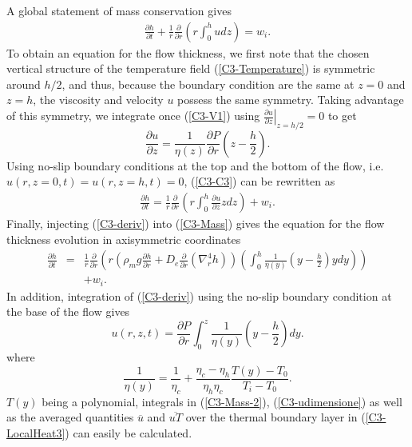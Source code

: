 A global statement of mass conservation gives
\begin{eqnarray}
  \frac{\partial h}{\partial t}+ \frac{1}{r}
  \frac{\partial}{\partial
  r} \left( r\int_0^hudz\right)= w_i.
  \label{C3-C3}
\end{eqnarray}
To obtain an  equation for the flow thickness, we  first note that the
chosen    vertical     structure    of    the     temperature    field
(\ref{C3-Temperature}) is  symmetric around  $h/2$, and  thus, because
the boundary condition are the same  at $z=0$ and $z=h$, the viscosity
and velocity $u$ possess the  same symmetry.  Taking advantage of this
symmetry,      we     integrate      once     (\ref{C3-V1})      using
$\left.\frac{\partial u}{\partial z}\right|_{z=h/2}=0$ to get
\begin{equation}
  \frac{\partial   u}{\partial   z}   =   \frac{1}{\eta(z)}\frac{\partial
    P}{\partial r}\left(z-\frac{h}{2}\right).
  \label{C3-deriv}
\end{equation}
Using no-slip  boundary conditions at  the top  and the bottom  of the
flow, i.e.  $u(r,z=0,t)=u(r,z=h,t)=0$,  (\ref{C3-C3}) can be rewritten
as
\begin{eqnarray}
  \frac{\partial h}{\partial t} = \frac{1}{r}
  \frac{\partial}{\partial
  r} \left( r\int_0^h\frac{\partial u}{\partial z}zdz\right) + w_i.
  \label{C3-Mass}
\end{eqnarray}
Finally,  injecting (\ref{C3-deriv})  into  (\ref{C3-Mass}) gives  the
equation for the flow thickness evolution in axisymmetric coordinates
\begin{eqnarray}
  \frac{\partial h}{\partial t} &=& \frac{1}{r}
  \frac{\partial}{\partial r} \left( r\left(\rho_m g \frac{\partial h}{\partial      r}+D_e\frac{\partial}{\partial      r}\left(\nabla_r^4h\right)\right)\left(\int_0^h\frac{1}{\eta(y)}\left(y-\frac{h}{2}\right)ydy\right)\right)\nonumber\\
  &&+ w_i.
  \label{C3-Mass-2}
\end{eqnarray}
In  addition,  integration  of   (\ref{C3-deriv})  using  the  no-slip
boundary condition at the base of the flow gives
\begin{equation}
  u(r,z,t)        =        \frac{\partial        P}{\partial        r}
  \int_0^z\frac{1}{\eta(y)}\left(y-\frac{h}{2}\right)dy.
  \label{C3-udimensione}
\end{equation}
where
\begin{equation}
  \frac{1}{\eta(y)} = \frac{1}{\eta_c}+\frac{\eta_c-\eta_h}{\eta_h\eta_c}\frac{T(y)-T_0}{T_i-T_0}.
\end{equation}
$T(y)$    being   a    polynomial,   integrals    in   (\ref{C3-Mass-2}),
(\ref{C3-udimensione})   as   well    as   the   averaged   quantities
$\overline{u}$ and $\overline{uT}$ over  the thermal boundary layer in
(\ref{C3-LocalHeat3}) can easily be calculated.

